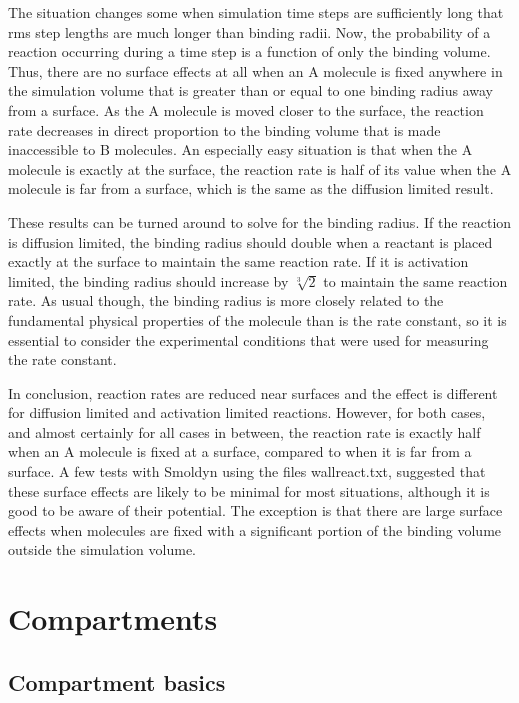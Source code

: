 \documentclass {book}
\begin{document}
The situation changes some when simulation time steps are sufficiently long that rms step lengths are much longer than binding radii. Now, the probability of a reaction occurring during a time step is a function of only the binding volume. Thus, there are no surface effects at all when an A molecule is fixed anywhere in the simulation volume that is greater than or equal to one binding radius away from a surface. As the A molecule is moved closer to the surface, the reaction rate decreases in direct proportion to the binding volume that is made inaccessible to B molecules. An especially easy situation is that when the A molecule is exactly at the surface, the reaction rate is half of its value when the A molecule is far from a surface, which is the same as the diffusion limited result.

These results can be turned around to solve for the binding radius. If the reaction is diffusion limited, the binding radius should double when a reactant is placed exactly at the surface to maintain the same reaction rate. If it is activation limited, the binding radius should increase by $\sqrt[3]{2}$ to maintain the same reaction rate. As usual though, the binding radius is more closely related to the fundamental physical properties of the molecule than is the rate constant, so it is essential to consider the experimental conditions that were used for measuring the rate constant.

In conclusion, reaction rates are reduced near surfaces and the effect is different for diffusion limited and activation limited reactions. However, for both cases, and almost certainly for all cases in between, the reaction rate is exactly half when an A molecule is fixed at a surface, compared to when it is far from a surface. A few tests with Smoldyn using the files wallreact.txt, suggested that these surface effects are likely to be minimal for most situations, although it is good to be aware of their potential. The exception is that there are large surface effects when molecules are fixed with a significant portion of the binding volume outside the simulation volume.


\chapter{Compartments}

\section{Compartment basics}
\end{document}
